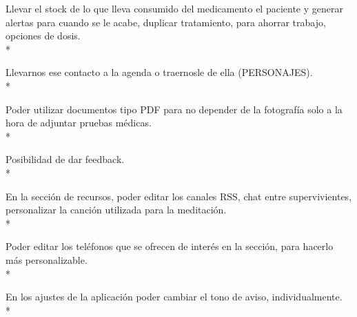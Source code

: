 \documentclass[../pfc.tex]{subfiles}
\begin{document}
	Llevar el stock de lo que lleva consumido del medicamento el paciente y generar alertas para cuando se le acabe, duplicar tratamiento, para ahorrar trabajo, opciones de dosis.\\*
	
	Llevarnos ese contacto a la agenda o traernosle de ella (PERSONAJES).\\*
	
	Poder utilizar documentos tipo PDF para no depender de la fotografía solo a la hora de adjuntar pruebas médicas.\\*
	
	Posibilidad de dar feedback.\\*
	
	En la sección de recursos, poder editar los canales RSS, chat entre supervivientes, personalizar la canción utilizada para la meditación.\\*
	
	Poder editar los teléfonos que se ofrecen de interés en la sección, para hacerlo más personalizable.\\*
	
	En los ajustes de la aplicación poder cambiar el tono de aviso, individualmente.\\* 
		
	
	


	

	
\end{document}
